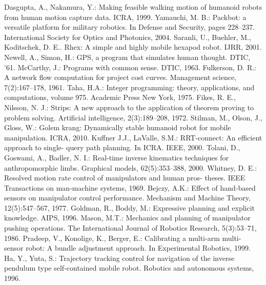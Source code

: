 \documentclass[runningheads,a4paper]{llncs}
\begin{document}
\begin{thebibliography}{27}
 Dasgupta, A., Nakamura, Y.: Making feasible walking motion of
humanoid robots from human motion capture data. ICRA, 1999.
 Yamauchi, M. B.: Packbot: a versatile platform for military robotics. In Defense
and Security, pages 228–237. International Society for Optics and Photonics, 2004.
 Saranli, U., Buehler, M., Koditschek, D. E.. Rhex: A simple and
highly mobile hexapod robot. IJRR, 2001.
 Newell, A., Simon, H.: GPS, a program that simulates human thought.
DTIC, '61.
 McCarthy, J.: Programs with common sense. DTIC, 1963.
 Fulkerson, D. R.: A network flow computation for project cost curves. Management science, 7(2):167–178, 1961.
 Taha, H.A.: Integer programming: theory, applications, and computations,
volume 975. Academic Press New York, 1975.
 Fikes, R. E., Nilsson, N. J.: Strips: A new approach to the application of
theorem proving to problem solving. Artificial intelligence, 2(3):189–208, 1972.
 Stilman, M., Olson, J., Gloss, W.: Golem krang: Dynamically stable
humanoid robot for mobile manipulation. ICRA, 2010.
 Kuffner J.J., LaValle, S.M.: RRT-connect: An efficient approach to single-
query path planning. In ICRA. IEEE, 2000.
 Tolani, D., Goswami, A., Badler, N. I.: Real-time inverse kinematics techniques for anthropomorphic limbs. Graphical models, 62(5):353–388,
2000.
 Whitney, D. E.: Resolved motion rate control of manipulators and human pros-
theses. IEEE Transactions on man-machine systems, 1969.
 Bejczy, A.K.: Effect of hand-based sensors on manipulator control performance.
Mechanism and Machine Theory, 12(5):547–567, 1977.
 Goldman, R., Boddy, M.: Expressive planning and explicit knowledge. AIPS, 1996.
 Mason, M.T.: Mechanics and planning of manipulator pushing operations.
The International Journal of Robotics Research, 5(3):53–71, 1986.
 Pradeep, V., Konolige, K., Berger, E.: Calibrating a multi-arm multi-
sensor robot: A bundle adjustment approach. In Experimental Robotics, 1999.
 Ha, Y., Yuta, S.: Trajectory tracking control for navigation of the
inverse pendulum type self-contained mobile robot. Robotics and autonomous systems, 1996.

\end{thebibliography}
\end{document}
